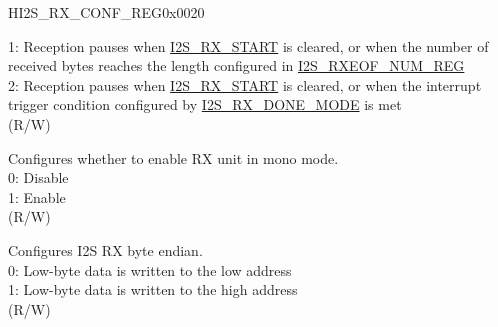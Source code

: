 \begin{register}{H}{I2S\_RX\_CONF\_REG}{0x0020}
\begin{regdesc}
\begin{reglist}
1: Reception pauses when \hyperref[fielddesc:I2SRXSTART]{I2S\_RX\_START} is cleared, or when the number of received bytes reaches the length configured in \hyperref[regdesc:I2SRXEOFNUMREG]{I2S\_RXEOF\_NUM\_REG}\\
2: Reception pauses when \hyperref[fielddesc:I2SRXSTART]{I2S\_RX\_START} is cleared, or when the interrupt trigger condition configured by \hyperref[fielddesc:I2SRXDONEMODE]{I2S\_RX\_DONE\_MODE} is met\\
(R/W)
\label{fielddesc:I2SRXMONO}\item [I2S\_RX\_MONO] Configures whether to enable RX unit in mono mode. \\
0: Disable\\
1: Enable\\
(R/W)
\label{fielddesc:I2SRXBIGENDIAN}\item [I2S\_RX\_BIG\_ENDIAN] Configures I2S RX byte endian. \\
0: Low-byte data is written to the low address\\
1: Low-byte data is written to the high address\\
(R/W)

\item [Continued on the next page...]
\end{reglist}\end{regdesc}
\end{register}
\addtocounter{Regfloat}{-1}
